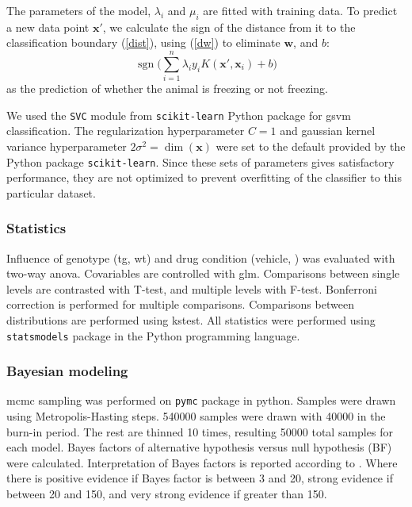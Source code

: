 The parameters of the model, $\lambda_i$ and $\mu_i$ are fitted with training data. To predict a new data point $\mathbf{x}'$, we calculate the sign of the distance from it to the classification boundary (\ref{dist}), using (\ref{dw}) to eliminate $\mathbf{w}$, and $b$:
\begin{equation*}
    \operatorname{sgn}\Big(\sum_{i=1}^n\lambda_iy_iK(\mathbf{x}', \mathbf{x}_i) + b\Big)
\end{equation*}
as the prediction of whether the animal is freezing or not freezing.

We used the \texttt{SVC} module from \texttt{scikit-learn} Python package for \gls{gsvm} classification. The regularization hyperparameter $C=1$ and gaussian kernel variance hyperparameter $2\sigma^2=\operatorname{dim}(\mathbf{x})$ were set to the default provided by the Python package \texttt{scikit-learn}. Since these sets of parameters gives satisfactory performance, they are not optimized to prevent overfitting of the classifier to this particular dataset.



\subsubsection{Statistics}

Influence of genotype (\gls{tg}, \gls{wt}) and drug condition (vehicle, \glu) was evaluated with two-way \gls{anova}. Covariables are controlled with \gls{glm}. Comparisons between single levels are contrasted with T-test, and multiple levels with F-test. Bonferroni correction is performed for multiple comparisons. Comparisons between distributions are performed using \gls{kstest}. All statistics were performed using \texttt{statsmodels} package in the Python programming language.

\subsubsection{Bayesian modeling}
\Gls{mcmc} sampling was performed on \texttt{pymc} package in python. Samples were drawn using Metropolis-Hasting steps. \num{540000} samples were drawn with \num{40000} in the burn-in period. The rest are thinned \num{10} times, resulting \num{50000} total samples for each model. Bayes factors of alternative hypothesis versus null hypothesis (BF) were calculated. Interpretation of Bayes factors is reported according to . Where there is positive evidence if Bayes factor is between 3 and 20, strong evidence if between 20 and 150, and very strong evidence if greater than 150.

